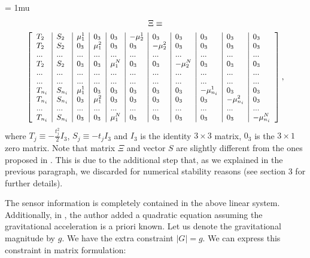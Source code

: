 \documentclass[letterpaper, 10 pt, conference]{ieeeconf}  %
\begin{document}
{
\arraycolsep=3pt %
\medmuskip = 1mu %
\begin{multline*}
  \Xi \equiv \\
      {
        \footnotesize
        \left[
          \begin{array}{l|l|l|l|l|l|l|l|l|l|l}
            T_2 & S_2 & \mu_1^1 & 0_3 & 0_3 & -\mu_2^1 & 0_3 & 0_3 & 0_3 & 0_3 & 0_3 \\
            T_2 & S_2 & 0_3 & \mu_1^2 & 0_3 & 0_3 & -\mu_2^2 & 0_3 & 0_3 & 0_3 & 0_3 \\
            ... & ... & ... & ... & ... & ... & ... & ... & ... & ... & ... \\
            T_2 & S_2 & 0_3 & 0_3 & \mu_1^N & 0_3 & 0_3 & -\mu_2^N & 0_3 & 0_3 & 0_3 \\
            ... & ... & ... & ... & ... & ... & ... & ... & ... & ... & ... \\
            ... & ... & ... & ... & ... & ... & ... & ... & ... & ... & ... \\
            T_{n_i} & S_{n_i} & \mu_1^1 & 0_3 & 0_3 & 0_3 & 0_3 & 0_3 & -\mu_{n_i}^1 & 0_3 & 0_3 \\
            T_{n_i} & S_{n_i} & 0_3 & \mu_1^2 & 0_3 & 0_3 & 0_3 & 0_3 & 0_3 & -\mu_{n_i}^2 & 0_3 \\
            ... & ... & ... & ... & ... & ... & ... & ... & ... & ... & ... \\
            T_{n_i} & S_{n_i} & 0_3 & 0_3 & \mu_1^N & 0_3 & 0_3 & 0_3 & 0_3 & 0_3 & -\mu_{n_i}^N
          \end{array}
          \right],
      }
\end{multline*}
}
\noindent where $T_j \equiv - \frac{t^2_j}{2} I_3$, $S_j \equiv -t_j I_3$ and $I_3$ is the identity $3\times 3$ matrix, $0_3$ is the $3\times 1$ zero matrix.
Note that matrix $\Xi$ and vector $S$ are slightly different from the ones proposed in \cite{Martinelli2014}.
This is due to the additional step that, as we explained in the previous paragraph, we discarded for numerical stability reasons (see \cite{Martinelli2014} section 3 for further details).

The sensor information is completely contained in the above linear system. Additionally, in \cite{Martinelli2014}, the author added a quadratic equation assuming the gravitational acceleration is a priori known.
Let us denote the gravitational magnitude by $g$.
We have the extra constraint $|G| = g$. We can express this constraint in matrix formulation:
\end{document}

